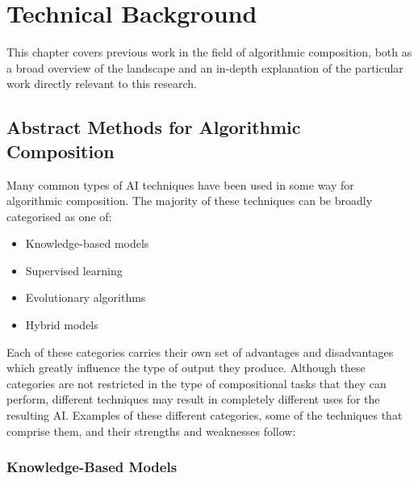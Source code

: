 \documentclass[ author={Stephen Livermore-Tozer},
				supervisor={Dr. Peter Flach},
				degree={MEng},
				title={Performing Algorithmic Co-composition Using Machine Learning},
				subtitle={},
				type={research},
				year={2016} ]{dissertation}
\begin{document}
	
	\chapter{Technical Background}
	\label{chap:technical}
	
	This chapter covers previous work in the field of algorithmic composition, both as a broad overview of the landscape and an in-depth explanation of the particular work directly relevant to this research.

	\section{Abstract Methods for Algorithmic Composition}
	\label{sec:abstract-methods}
	
	Many common types of AI techniques have been used in some way for algorithmic composition. The majority of these techniques can be broadly categorised as one of:
	\begin{itemize}
		\item Knowledge-based models
		\item Supervised learning
		\item Evolutionary algorithms
		\item Hybrid models
	\end{itemize}
	Each of these categories carries their own set of advantages and disadvantages which greatly influence the type of output they produce. Although these categories are not restricted in the type of compositional tasks that they can perform, different techniques may result in completely different uses for the resulting AI. Examples of these different categories, some of the techniques that comprise them, and their strengths and weaknesses follow:
	
	\subsection{Knowledge-Based Models}
	\label{sec:knowledge-systems}
	
\end{document}

